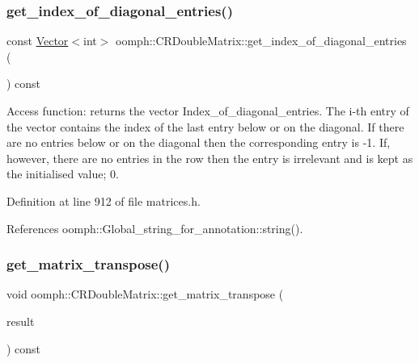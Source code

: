 \mbox{\label{classoomph_1_1CRDoubleMatrix_a80c3342b36dbcdf60bb21676fda66c97}} 
\subsubsection{\texorpdfstring{get\+\_\+index\+\_\+of\+\_\+diagonal\+\_\+entries()}{get\_index\_of\_diagonal\_entries()}}
{\footnotesize\ttfamily const \hyperlink{classoomph_1_1Vector}{Vector}$<$int$>$ oomph\+::\+C\+R\+Double\+Matrix\+::get\+\_\+index\+\_\+of\+\_\+diagonal\+\_\+entries (\begin{DoxyParamCaption}{ }\end{DoxyParamCaption}) const\hspace{0.3cm}{\ttfamily [inline]}}



Access function\+: returns the vector Index\+\_\+of\+\_\+diagonal\+\_\+entries. The i-\/th entry of the vector contains the index of the last entry below or on the diagonal. If there are no entries below or on the diagonal then the corresponding entry is -\/1. If, however, there are no entries in the row then the entry is irrelevant and is kept as the initialised value; 0. 



Definition at line 912 of file matrices.\+h.



References oomph\+::\+Global\+\_\+string\+\_\+for\+\_\+annotation\+::string().

\mbox{\label{classoomph_1_1CRDoubleMatrix_a82cb428139f7c35a7c62a09fad38eecb}} 
\subsubsection{\texorpdfstring{get\+\_\+matrix\+\_\+transpose()}{get\_matrix\_transpose()}}
{\footnotesize\ttfamily void oomph\+::\+C\+R\+Double\+Matrix\+::get\+\_\+matrix\+\_\+transpose (\begin{DoxyParamCaption}\item[{\hyperlink{classoomph_1_1CRDoubleMatrix}{C\+R\+Double\+Matrix} $\ast$}]{result }\end{DoxyParamCaption}) const}



